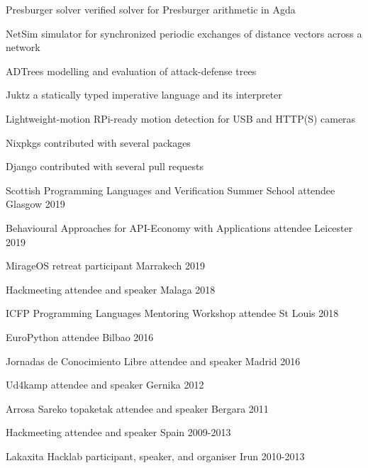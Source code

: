 \documentclass[11pt, a4paper]{awesome-cv}
\begin{document}

\begin{cvskills}
    \cvskill
        {Presburger solver}
        {verified solver for Presburger arithmetic in Agda}

    \cvskill
        {NetSim}
        {simulator for synchronized periodic exchanges of distance vectors
        across a network}

    \cvskill
        {ADTrees}
        {modelling and evaluation of attack-defense trees}

    \cvskill
        {Juktz}
        {a statically typed imperative language and its interpreter}

    \cvskill
        {Lightweight-motion}
        {RPi-ready motion detection for USB and HTTP(S) cameras}

    \cvskill
        {Nixpkgs}
        {contributed with several packages}

    \cvskill
        {Django}
        {contributed with several pull requests}
\end{cvskills}


\begin{cvhonors}
    \cvhonor
      {Scottish Programming Languages and Verification Summer School}
      {attendee}
      {Glasgow}
      {2019}

    \cvhonor
      {Behavioural Approaches for API-Economy with Applications}
      {attendee}
      {Leicester}
      {2019}

    \cvhonor
      {MirageOS retreat}
      {participant}
      {Marrakech}
      {2019}

    \cvhonor
      {Hackmeeting}
      {attendee and speaker}
      {Malaga}
      {2018}

    \cvhonor
      {ICFP}
      {Programming Languages Mentoring Workshop attendee}
      {St Louis}
      {2018}

    \cvhonor
      {EuroPython}
      {attendee}
      {Bilbao}
      {2016}

    \cvhonor
      {Jornadas de Conocimiento Libre}
      {attendee and speaker}
      {Madrid}
      {2016}

    \cvhonor
      {Ud4kamp}
      {attendee and speaker}
      {Gernika}
      {2012}

    \cvhonor
      {Arrosa Sareko topaketak}
      {attendee and speaker}
      {Bergara}
      {2011}

    \cvhonor
      {Hackmeeting}
      {attendee and speaker}
      {Spain}
      {2009-2013}
  
    \cvhonor
      {Lakaxita Hacklab}
      {participant, speaker, and organiser}
      {Irun}
      {2010-2013}
\end{cvhonors}
\end{document}
